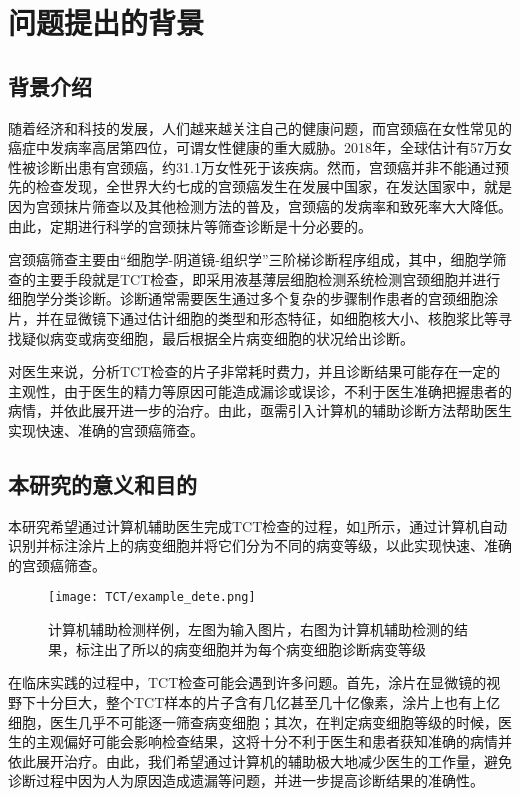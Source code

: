 \section{问题提出的背景}

\subsection{背景介绍}
\par 随着经济和科技的发展，人们越来越关注自己的健康问题，而宫颈癌在女性常见的癌症中发病率高居第四位，可谓女性健康的重大威胁。2018年，全球估计有57万女性被诊断出患有宫颈癌，约31.1万女性死于该疾病。然而，宫颈癌并非不能通过预先的检查发现，全世界大约七成的宫颈癌发生在发展中国家\cite{wild2014world}，在发达国家中，就是因为宫颈抹片筛查以及其他检测方法的普及，宫颈癌的发病率和致死率大大降低\cite{canavan2000cervical}。由此，定期进行科学的宫颈抹片等筛查诊断是十分必要的。
\par 宫颈癌筛查主要由“细胞学-阴道镜-组织学”三阶梯诊断程序组成，其中，细胞学筛查的主要手段就是TCT检查，即采用液基薄层细胞检测系统检测宫颈细胞并进行细胞学分类诊断。诊断通常需要医生通过多个复杂的步骤制作患者的宫颈细胞涂片，并在显微镜下通过估计细胞的类型和形态特征，如细胞核大小、核胞浆比等寻找疑似病变或病变细胞，最后根据全片病变细胞的状况给出诊断。
\par 对医生来说，分析TCT检查的片子非常耗时费力，并且诊断结果可能存在一定的主观性，由于医生的精力等原因可能造成漏诊或误诊，不利于医生准确把握患者的病情，并依此展开进一步的治疗。由此，亟需引入计算机的辅助诊断方法帮助医生实现快速、准确的宫颈癌筛查。
\subsection{本研究的意义和目的}
\par 本研究希望通过计算机辅助医生完成TCT检查的过程，如\ref{检测}所示，通过计算机自动识别并标注涂片上的病变细胞并将它们分为不同的病变等级，以此实现快速、准确的宫颈癌筛查。
\begin{figure}[h]
    \centering
    \texttt{[image: TCT/example\_dete.png]}
    \caption{计算机辅助检测样例，左图为输入图片，右图为计算机辅助检测的结果，标注出了所以的病变细胞并为每个病变细胞诊断病变等级}
    \label{检测}
\end{figure}

\par 在临床实践的过程中，TCT检查可能会遇到许多问题。首先，涂片在显微镜的视野下十分巨大，整个TCT样本的片子含有几亿甚至几十亿像素，涂片上也有上亿细胞，医生几乎不可能逐一筛查病变细胞；其次，在判定病变细胞等级的时候，医生的主观偏好可能会影响检查结果，这将十分不利于医生和患者获知准确的病情并依此展开治疗。由此，我们希望通过计算机的辅助极大地减少医生的工作量，避免诊断过程中因为人为原因造成遗漏等问题，并进一步提高诊断结果的准确性。
